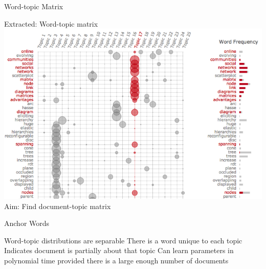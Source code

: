 \documentclass{lecture}
\begin{document}
\begin{plain}{Word-topic Matrix}
\begin{center}
\vspace{-2ex}
Extracted: Word-topic matrix
\includegraphics[scale=0.36]{figs/word_topic}\\
Aim: Find document-topic matrix
\end{center}
\end{plain}

\begin{plain}{Anchor Words}
\begin{itemize}
	\p Word-topic distributions are separable
	\p There is a word unique to each topic
	\p Indicates document is partially about that topic
	\p Can learn parameters in polynomial time provided there is a large enough number of documents
\end{itemize}
\end{plain}
\end{document}
